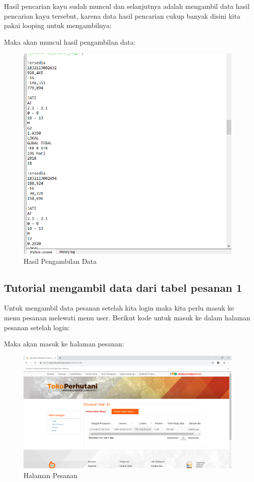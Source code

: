 Hasil pencarian kayu sudah muncul dan selanjutnya adalah mengambil data hasil pencarian kayu tersebut, karena data hasil pencarian cukup banyak disini kita pakai looping untuk mengambilnya:


Maka akan muncul hasil pengambilan data:
\begin{figure}[h]
	\centering
	\includegraphics[scale=0.30]{figures/7dataambil}
	\caption{Hasil Pengambilan Data}
\end{figure}
\newpage
\subsection{Tutorial mengambil data dari tabel pesanan 1}
Untuk mengambil data pesanan setelah kita login maka kita perlu masuk ke menu pesanan melewati menu user.
Berikut kode untuk masuk ke dalam halaman pesanan setelah login:

Maka akan masuk ke halaman pesanan:
\begin{figure}[h]
	\centering
	\includegraphics[scale=0.30]{figures/8pesanan}
	\caption{Halaman Pesanan}
\end{figure}

